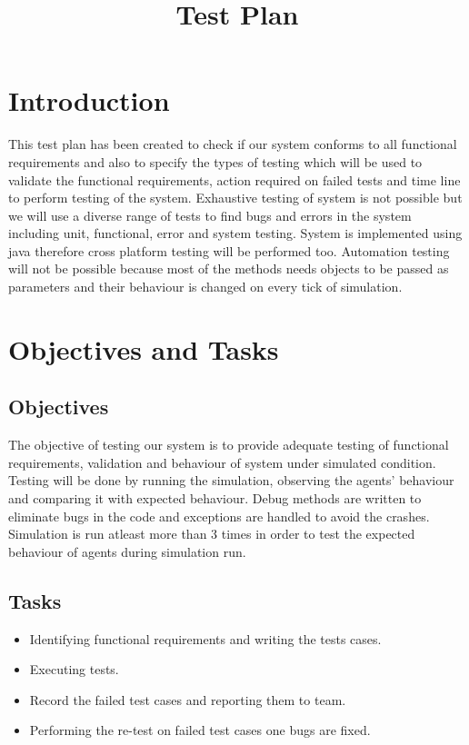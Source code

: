 \documentclass[11pt]{article}
\title{Test Plan}
\author{}
\begin{document}
\maketitle
\section{Introduction}
This test plan has been created to check if our system conforms to all functional requirements and also to specify the types of testing which will be used to validate the functional requirements, action required on failed tests and time line to perform testing of the system. Exhaustive testing of system is not possible but we will use a diverse range of tests to find bugs and errors in the system including unit, functional, error and system testing. System is implemented using java therefore cross platform testing will be performed too. Automation testing will not be possible because most of the methods needs objects to be passed as parameters and their behaviour is changed on every tick of simulation. 

\section{Objectives and Tasks}
\subsection{Objectives}
    The objective of testing our system is to provide adequate testing of functional requirements, validation and behaviour of system under simulated condition. Testing will be done by running the simulation, observing the agents' behaviour and comparing it with expected behaviour. Debug methods are written to eliminate bugs in the code and exceptions are handled to avoid the crashes. Simulation is run atleast more than 3 times in order to test the expected behaviour of agents during simulation run.

\subsection{Tasks}
\begin{itemize}
	\item Identifying functional requirements and writing the tests cases.

	\item Executing tests.

	\item Record the failed test cases and reporting them to team.

	\item Performing the re-test on failed test cases one bugs are fixed.
\end{itemize}
\end{document}
